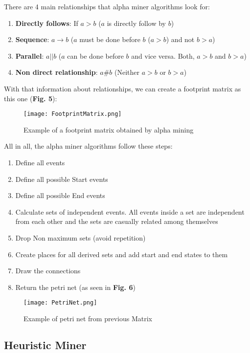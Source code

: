 \documentclass[conference]{IEEEtran}
\begin{document}
There are 4 main relationships that alpha miner algorithms look for:
\begin{enumerate}
    \item \textbf{Directly follows}: If $a>b$ ($a$ is directly follow by $b$)
    \item \textbf{Sequence}: $a\rightarrow b$ ($a$ must be done before $b$ ($a>b$) and not $b>a$)
    \item \textbf{Parallel}: $a||b$ ($a$ can be done before $b$ and vice versa. Both, $a>b$ and $b>a$)
    \item \textbf{Non direct relationship}: $a\#b$ (Neither $a>b$ or $b>a$)
\end{enumerate}

With that information about relationships, we can create a footprint matrix as this one (\textbf{Fig. 5}):

\begin{figure}[htp]
    \centering
    \texttt{[image: FootprintMatrix.png]}
    \caption{Example of a footprint matrix obtained by alpha mining}
    \label{fig:modelDrawn}
\end{figure}

All in all, the alpha miner algorithms follow these steps:

\begin{enumerate}
    \item Define all events
    \item Define all possible Start events
    \item Define all possible End events
    \item Calculate sets of independent events. All events inside a set are independent from each other and the sets are casually related among themselves
    \item Drop Non maximum sets (avoid repetition)
    \item Create places for all derived sets and add start and end states to them
    \item Draw the connections
    \item Return the petri net (as seen in \textbf{Fig. 6})
\end{enumerate}

\begin{figure}[htp]
    \centering
    \texttt{[image: PetriNet.png]}
    \caption{Example of petri net from previous Matrix}
    \label{fig:modelDrawn}
\end{figure}

\subsection{Heuristic Miner}
\end{document}
